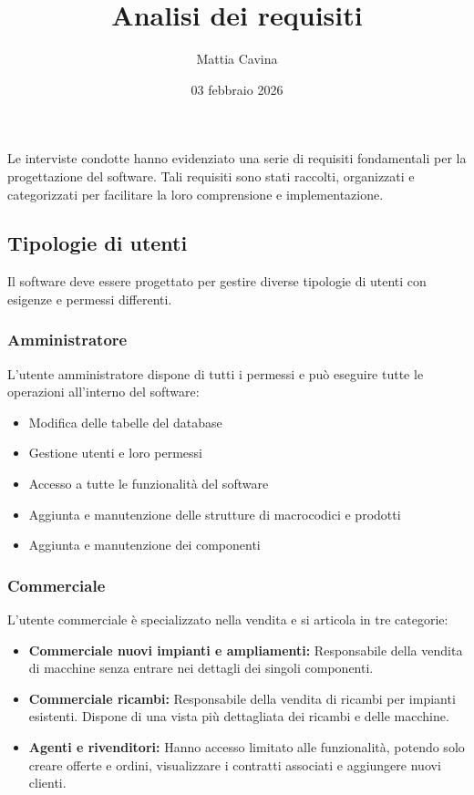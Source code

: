 \documentclass[12pt, a4paper]{article}
\title{Analisi dei requisiti}
\author{Mattia Cavina}
\date{03 febbraio 2026}
\begin{document}
Le interviste condotte hanno evidenziato una serie di requisiti fondamentali per la progettazione del software.
Tali requisiti sono stati raccolti, organizzati e categorizzati per facilitare la loro comprensione e implementazione.

\subsection{Tipologie di utenti}

Il software deve essere progettato per gestire diverse tipologie di utenti con esigenze e permessi differenti.

\subsubsection{Amministratore}

L'utente amministratore dispone di tutti i permessi e può eseguire tutte le operazioni all'interno del software:
\begin{itemize}
      \item Modifica delle tabelle del database
      \item Gestione utenti e loro permessi
      \item Accesso a tutte le funzionalità del software
      \item Aggiunta e manutenzione delle strutture di macrocodici e prodotti
      \item Aggiunta e manutenzione dei componenti
\end{itemize}

\subsubsection{Commerciale}

L'utente commerciale è specializzato nella vendita e si articola in tre categorie:

\begin{itemize}
      \item \textbf{Commerciale nuovi impianti e ampliamenti:} Responsabile della vendita di macchine senza entrare nei dettagli dei singoli componenti.
      \item \textbf{Commerciale ricambi:} Responsabile della vendita di ricambi per impianti esistenti. Dispone di una vista più dettagliata dei ricambi e delle macchine.
      \item \textbf{Agenti e rivenditori:} Hanno accesso limitato alle funzionalità, potendo solo creare offerte e ordini, visualizzare i contratti associati e aggiungere nuovi clienti.
\end{itemize}
\end{document}
